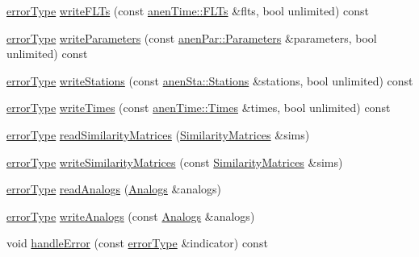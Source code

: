 \begin{DoxyCompactItemize}
\item 
\mbox{\hyperlink{class_an_en_i_o_aa56bc1ec6610b86db4349bce20f9ead0}{error\+Type}} \mbox{\hyperlink{class_an_en_i_o_a150e3fc6fe249b11bac909e5ee843a58}{write\+F\+L\+Ts}} (const \mbox{\hyperlink{classanen_time_1_1_f_l_ts}{anen\+Time\+::\+F\+L\+Ts}} \&flts, bool unlimited) const
\item 
\mbox{\hyperlink{class_an_en_i_o_aa56bc1ec6610b86db4349bce20f9ead0}{error\+Type}} \mbox{\hyperlink{class_an_en_i_o_a9ae88d089b2de16571085cb6f7f4cefb}{write\+Parameters}} (const \mbox{\hyperlink{classanen_par_1_1_parameters}{anen\+Par\+::\+Parameters}} \&parameters, bool unlimited) const
\item 
\mbox{\hyperlink{class_an_en_i_o_aa56bc1ec6610b86db4349bce20f9ead0}{error\+Type}} \mbox{\hyperlink{class_an_en_i_o_ac4cb6e66c0661eff0a10dcc3cb3324e8}{write\+Stations}} (const \mbox{\hyperlink{classanen_sta_1_1_stations}{anen\+Sta\+::\+Stations}} \&stations, bool unlimited) const
\item 
\mbox{\hyperlink{class_an_en_i_o_aa56bc1ec6610b86db4349bce20f9ead0}{error\+Type}} \mbox{\hyperlink{class_an_en_i_o_a13ba268b1cae107c145ad8ed895ddedd}{write\+Times}} (const \mbox{\hyperlink{classanen_time_1_1_times}{anen\+Time\+::\+Times}} \&times, bool unlimited) const
\item 
\mbox{\hyperlink{class_an_en_i_o_aa56bc1ec6610b86db4349bce20f9ead0}{error\+Type}} \mbox{\hyperlink{class_an_en_i_o_a237d03f50bb9101c40f7842694d25c5e}{read\+Similarity\+Matrices}} (\mbox{\hyperlink{class_similarity_matrices}{Similarity\+Matrices}} \&sims)
\item 
\mbox{\hyperlink{class_an_en_i_o_aa56bc1ec6610b86db4349bce20f9ead0}{error\+Type}} \mbox{\hyperlink{class_an_en_i_o_af4d66adaa8c94540dd6e7dd21c41be38}{write\+Similarity\+Matrices}} (const \mbox{\hyperlink{class_similarity_matrices}{Similarity\+Matrices}} \&sims)
\item 
\mbox{\hyperlink{class_an_en_i_o_aa56bc1ec6610b86db4349bce20f9ead0}{error\+Type}} \mbox{\hyperlink{class_an_en_i_o_ab9199c18d2a4a1e005dc5b1fefe6e75b}{read\+Analogs}} (\mbox{\hyperlink{class_analogs}{Analogs}} \&analogs)
\item 
\mbox{\hyperlink{class_an_en_i_o_aa56bc1ec6610b86db4349bce20f9ead0}{error\+Type}} \mbox{\hyperlink{class_an_en_i_o_a0a6326b1fe67f23b81667af12a99a5f0}{write\+Analogs}} (const \mbox{\hyperlink{class_analogs}{Analogs}} \&analogs)
\item 
void \mbox{\hyperlink{class_an_en_i_o_a92276aeba9c0b5bd1cd3d285271d505f}{handle\+Error}} (const \mbox{\hyperlink{class_an_en_i_o_aa56bc1ec6610b86db4349bce20f9ead0}{error\+Type}} \&indicator) const

\end{DoxyCompactItemize}
